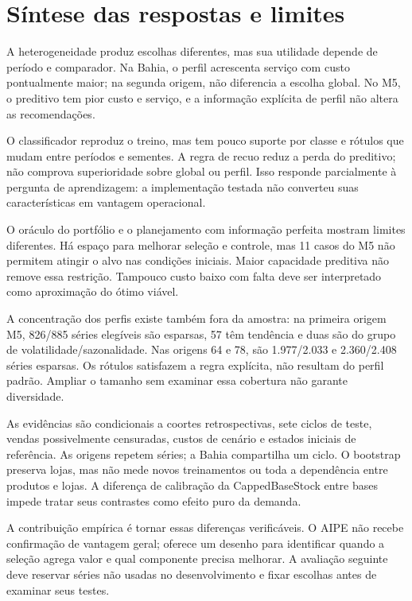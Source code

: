 \section{Síntese das respostas e limites}
\label{sec:threats}\label{sec:resultados_m5}
A heterogeneidade produz escolhas diferentes, mas sua utilidade depende de período e comparador. Na Bahia, o perfil acrescenta serviço com custo pontualmente maior; na segunda origem, não diferencia a escolha global. No M5, o preditivo tem pior custo e serviço, e a informação explícita de perfil não altera as recomendações.

O classificador reproduz o treino, mas tem pouco suporte por classe e rótulos que mudam entre períodos e sementes. A regra de recuo reduz a perda do preditivo; não comprova superioridade sobre global ou perfil. Isso responde parcialmente à pergunta de aprendizagem: a implementação testada não converteu suas características em vantagem operacional.

O oráculo do portfólio e o planejamento com informação perfeita mostram limites diferentes. Há espaço para melhorar seleção e controle, mas 11 casos do M5 não permitem atingir o alvo nas condições iniciais. Maior capacidade preditiva não remove essa restrição. Tampouco custo baixo com falta deve ser interpretado como aproximação do ótimo viável.

A concentração dos perfis existe também fora da amostra: na primeira origem M5, 826/885 séries elegíveis são esparsas, 57 têm tendência e duas são do grupo de volatilidade/sazonalidade. Nas origens 64 e 78, são 1.977/2.033 e 2.360/2.408 séries esparsas. Os rótulos satisfazem a regra explícita, não resultam do perfil padrão. Ampliar o tamanho sem examinar essa cobertura não garante diversidade.

As evidências são condicionais a coortes retrospectivas, sete ciclos de teste, vendas possivelmente censuradas, custos de cenário e estados iniciais de referência. As origens repetem séries; a Bahia compartilha um ciclo. O bootstrap preserva lojas, mas não mede novos treinamentos ou toda a dependência entre produtos e lojas. A diferença de calibração da CappedBaseStock entre bases impede tratar seus contrastes como efeito puro da demanda.

A contribuição empírica é tornar essas diferenças verificáveis. O AIPE não recebe confirmação de vantagem geral; oferece um desenho para identificar quando a seleção agrega valor e qual componente precisa melhorar. A avaliação seguinte deve reservar séries não usadas no desenvolvimento e fixar escolhas antes de examinar seus testes.
